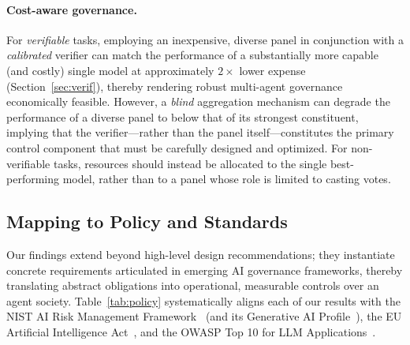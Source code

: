 \documentclass[manuscript,screen,review]{acmart}
\begin{document}
\paragraph{Cost-aware governance.} For \emph{verifiable} tasks, employing an inexpensive, diverse panel in conjunction with a \emph{calibrated} verifier can match the performance of a substantially more capable (and costly) single model at approximately $2\times$ lower expense (Section~\ref{sec:verif}), thereby rendering robust multi-agent governance economically feasible. However, a \emph{blind} aggregation mechanism can degrade the performance of a diverse panel to below that of its strongest constituent, implying that the verifier—rather than the panel itself—constitutes the primary control component that must be carefully designed and optimized. For non-verifiable tasks, resources should instead be allocated to the single best-performing model, rather than to a panel whose role is limited to casting votes.

\subsection{Mapping to Policy and Standards}
\label{sec:policy}
Our findings extend beyond high-level design recommendations; they instantiate concrete requirements articulated in emerging AI governance frameworks, thereby translating abstract obligations into operational, measurable controls over an agent society. Table~\ref{tab:policy} systematically aligns each of our results with the NIST AI Risk Management Framework~\cite{nist_airmf} (and its Generative AI Profile~\cite{nist_genai}), the EU Artificial Intelligence Act~\cite{eu_aiact}, and the OWASP Top 10 for LLM Applications~\cite{owasp_llm}.
\end{document}
